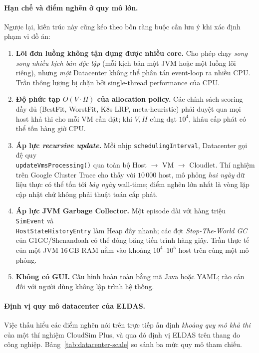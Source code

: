 \paragraph{Hạn chế và điểm nghẽn ở quy mô lớn.} Ngược lại, kiến trúc
này cũng kéo theo bốn ràng buộc cần lưu ý khi xác định phạm vi đồ án:
\begin{enumerate}
  \item \textbf{Lõi đơn luồng không tận dụng được nhiều core.} Cho
        phép chạy \emph{song song nhiều kịch bản độc lập} (mỗi kịch
        bản một JVM hoặc một luồng lõi riêng), nhưng \emph{một}
        Datacenter không thể phân tán event-loop ra nhiều CPU. Trần
        thông lượng bị chặn bởi single-thread performance của CPU.
  \item \textbf{Độ phức tạp $O(V \cdot H)$ của allocation policy.}
        Các chính sách scoring đầy đủ (BestFit, WorstFit, K8s LRP,
        meta-heuristic) phải duyệt qua mọi host khả thi cho mỗi VM
        cần đặt; khi $V, H$ cùng đạt $10^4$, khâu cấp phát có thể tốn
        hàng giờ CPU.
  \item \textbf{Áp lực \textit{recursive update}.} Mỗi nhịp
        \texttt{schedulingInterval}, Datacenter gọi đệ quy\\
        \texttt{updateVmsProcessing()} qua toàn bộ Host $\to$ VM $\to$
        Cloudlet. Thí nghiệm trên Google Cluster Trace cho thấy với
        $10\,000$ host, mô phỏng \emph{hai ngày} dữ liệu thực có thể
        tốn tới \emph{bảy ngày} wall-time;
        điểm nghẽn lớn nhất là vòng lặp cập nhật chứ không phải
        thuật toán cấp phát.
  \item \textbf{Áp lực JVM Garbage Collector.} Một episode dài với
        hàng triệu \texttt{SimEvent} và\\ \texttt{HostStateHistoryEntry}
        làm Heap đầy nhanh; các đợt \textit{Stop-The-World GC} của
        G1GC/Shenandoah có thể đóng băng tiến trình hàng giây. Trần
        thực tế của một JVM $16$\,GB RAM nằm vào khoảng
        $10^4$--$10^5$ host trên cùng một mô phỏng.
  \item \textbf{Không có GUI.} Cấu hình hoàn toàn bằng mã Java hoặc
        YAML; rào cản đối với người dùng không lập trình hệ thống.
\end{enumerate}

\paragraph{Định vị quy mô datacenter của ELDAS.}
\label{para:datacenter-scale}
Việc thấu hiểu các điểm nghẽn nói trên trực tiếp ấn định
\emph{khoảng quy mô khả thi} của một thí nghiệm CloudSim Plus, và
qua đó định vị ELDAS trên thang đo công nghiệp.
Bảng~\ref{tab:datacenter-scale} so sánh ba mức quy mô tham chiếu.

